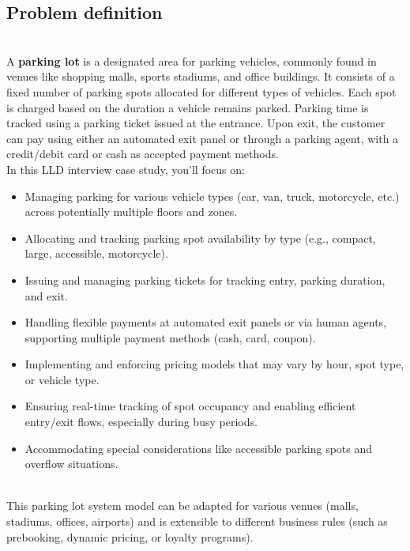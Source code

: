 

\subsection{Problem definition}\label{KfyitG1dioESlbYIcgWus-1}
\\
A \textbf{parking lot} is a designated area for parking vehicles, commonly found in venues like shopping malls, sports stadiums, and office buildings. It consists of a fixed number of parking spots allocated for different types of vehicles. Each spot is charged based on the duration a vehicle remains parked. Parking time is tracked using a parking ticket issued at the entrance. Upon exit, the customer can pay using either an automated exit panel or through a parking agent, with a credit/debit card or cash as accepted payment methods.
\\
In this LLD interview case study, you'll focus on:

\begin{itemize}
\item
\protect{}\label{yKo5kkWCCclz2DMPMu8qg}
Managing parking for various vehicle types (car, van, truck, motorcycle, etc.) across potentially multiple floors and zones.
\item
\protect{}\label{w0W_Soz8xt7NCBeXSLmMm}
Allocating and tracking parking spot availability by type (e.g., compact, large, accessible, motorcycle).
\item
\protect{}\label{g42ZJeCg28JXv8R_3FX2-}
Issuing and managing parking tickets for tracking entry, parking duration, and exit.
\item
\protect{}\label{uzG47MSOrJadbThSLC6IS}
Handling flexible payments at automated exit panels or via human agents, supporting multiple payment methods (cash, card, coupon).
\item
\protect{}\label{7QXjk0bdZLSOag3_NSk1d}
Implementing and enforcing pricing models that may vary by hour, spot type, or vehicle type.
\item
\protect{}\label{EgWvX-XlnnRswya-WWOA1}
Ensuring real-time tracking of spot occupancy and enabling efficient entry/exit flows, especially during busy periods.
\item
\protect{}\label{uGMc3KzQhzuWbhiZu5mZA}
Accommodating special considerations like accessible parking spots and overflow situations.
\end{itemize}
\\
This parking lot system model can be adapted for various venues (malls, stadiums, offices, airports) and is extensible to different business rules (such as prebooking, dynamic pricing, or loyalty programs).

